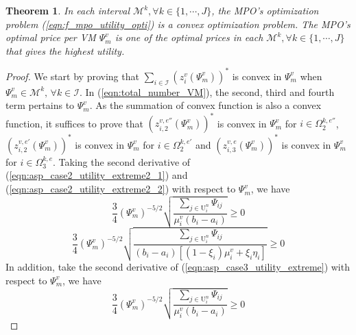 \documentclass[10pt,journal, compsoc]{IEEEtran}
\newtheorem{theorem}{Theorem}
\begin{document}
\begin{theorem} \label{thm:f_mpo_convex_optimization}
In each interval $\mathcal{M}^k, \forall k \in \{1, \cdots, J\}$, the MPO's optimization problem (\ref{eqn:f_mpo_utility_opti}) is a convex optimization problem. The MPO's optimal price per VM $\Psi_m^v$ is one of the optimal prices in each $\mathcal{M}^k, \forall k \in \{1, \cdots, J\}$ that gives the highest utility.
\end{theorem}
\begin{proof}
We start by proving that $\sum_{i \in \mathcal{I}} (z_{i}^v(\Psi_m^v))^*$ is convex in $\Psi_m^v$ when $\Psi_m^v \in \mathcal{M}^k,\, \forall k \in \mathcal{I}$. In (\ref{eqn:total_number_VM}), the second, third and fourth term pertains to $\Psi_m^v$. As the summation of convex function is also a convex function, it suffices to prove that $(z_{i,2}^{v,e''}(\Psi_m^v))^*$ is convex in $\Psi_m^v$ for $i \in \Omega_2^{k,e''}$, $(z_{i,2}^{v,e'}(\Psi_m^v))^*$ is convex in $\Psi_m^v$ for $i \in \Omega_2^{k,e'}$ and $(z_{i,3}^{v,e}(\Psi_m^v))^*$ is convex in $\Psi_m^v$ for $i \in \Omega_3^{k,e}$. Taking the second derivative of (\ref{eqn:asp_case2_utility_extreme2_1}) and (\ref{eqn:asp_case2_utility_extreme2_2}) with respect to $\Psi_m^v$, we have
\begin{equation}
\frac{3}{4}(\Psi_m^v)^{-5/2}\sqrt{\frac{\sum_{j \in \mathrm{U}_i^n}\Psi_{ij}}{\mu_i^v(b_i-a_i)}} \geq 0
\end{equation}
\begin{equation}
\frac{3}{4}(\Psi_m^v)^{-5/2}\sqrt{\frac{\sum_{j \in \mathrm{U}_i^n}\Psi_{ij}}{(b_i-a_i)[(1-\xi_i)\mu_i^v + \xi_i \eta_i]}} \geq 0
\end{equation}
In addition, take the second derivative of (\ref{eqn:asp_case3_utility_extreme}) with respect to $\Psi_m^v$, we have
\begin{equation}
\frac{3}{4}(\Psi_m^v)^{-5/2}\sqrt{\frac{\sum_{j \in \mathrm{U}_i^n}\Psi_{ij}}{\mu_i^v(b_i-a_i)}} \geq 0
\end{equation}


\end{proof}
\end{document}
